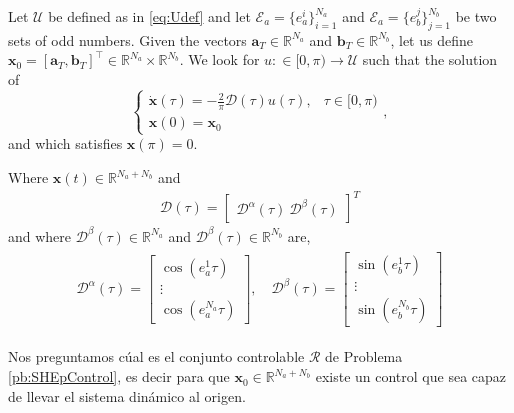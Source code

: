 \vspace{1em}
\begin{problem}\label{pb:SHEpControl}
    Let $\mathcal{U}$ be defined as in \eqref{eq:Udef} and let $\mathcal{E}_a = \{e_a^i\}_{i=1}^{N_a}$ and $\mathcal{E}_a = \{e_b^j\}_{j=1}^{N_b}$ be two sets of odd numbers. Given the vectors $\bm{a}_T \in \mathbb{R}^{N_a}$ and $\bm{b}_T \in \mathbb{R}^{N_b} $, let us define $\bm{x}_0=[\bm{a}_T,\bm{b}_T]^\top \in \mathbb{R}^{N_a}\times\mathbb{R}^{N_b}$. We look for $u:\in [0,\pi)\to\mathcal{U}$ such that the solution of 
    \begin{equation}\label{eq:CauchyReversed}
        \begin{cases}
            \displaystyle\dot{\bm{x}}(\tau) = -\frac 2\pi\bm{\mathcal{D}}(\tau)u(\tau),  & \tau \in [0,\pi)
            \\[6pt]
            \bm{x}(0) = \bm{x}_0
        \end{cases},
    \end{equation}
    and which satisfies $\bm{x}(\pi)=0$.

    Where $\bm{x}(t) \in \mathbb{R}^{N_a + N_b}$ and 
    \begin{gather}
        \bm{\mathcal{D}}(\tau) = 
        \begin{bmatrix} \bm{\mathcal{D}}^\alpha(\tau) \ \bm{\mathcal{D}}^\beta(\tau) \end{bmatrix}^T    
    \end{gather}
    and where $\bm{\mathcal{D}}^\beta(\tau) \in \mathbb{R}^{N_a} $ and $ \bm{\mathcal{D}}^\beta(\tau) \in \mathbb{R}^{N_b}$ are,
    \begin{gather}\label{eq:DalphaDbeta}
        \begin{align}
            \bm{\mathcal{D}}^\alpha(\tau) = 
            \begin{bmatrix} 
                \cos(e_a^1\tau) \\ \vdots \\ \cos(e_a^{N_a}\tau) 
            \end{bmatrix},
            \quad \bm{\mathcal{D}}^\beta(\tau) = 
            \begin{bmatrix} 
                \sin(e_b^1\tau) \\ \vdots \\ \sin(e_b^{N_b}\tau) 
            \end{bmatrix} 
        \end{align} 
    \end{gather}
    \end{problem}
    Nos preguntamos cúal es el conjunto controlable $\mathcal{R}$ de Problema \ref{pb:SHEpControl}, es decir para que $\bm{x}_0 \in \mathbb{R}^{N_a+N_b}$ existe un control que sea capaz de llevar el sistema dinámico al origen.

